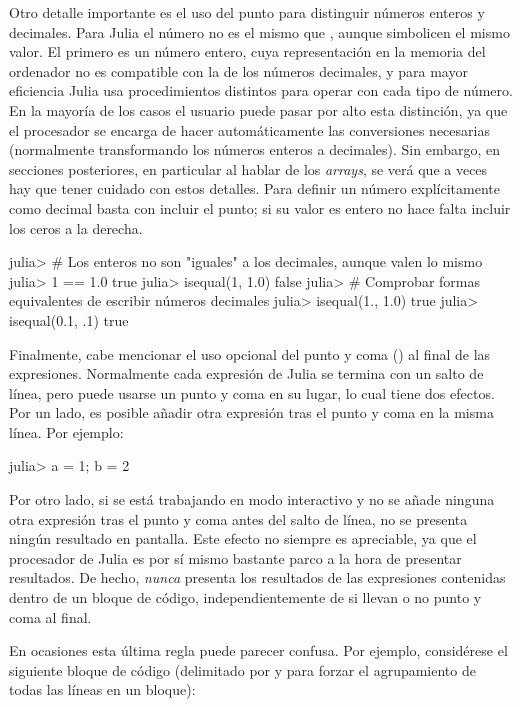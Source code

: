 Otro detalle importante es el uso del punto para distinguir números enteros y decimales. Para Julia el número  no es el mismo que , aunque simbolicen el mismo valor. El primero es un número entero, cuya representación en la memoria del ordenador no es compatible con la de los números decimales, y para mayor eficiencia Julia usa procedimientos distintos para operar con cada tipo de número. En la mayoría de los casos el usuario puede pasar por alto esta distinción, ya que el procesador se encarga de hacer automáticamente las conversiones necesarias (normalmente transformando los números enteros a decimales). Sin embargo, en secciones posteriores, en particular al hablar de los \emph{arrays}, se verá que a veces hay que tener cuidado con estos detalles. Para definir un número explícitamente como decimal basta con incluir el punto; si su valor es entero no hace falta incluir los ceros a la derecha.

\begin{jlconcode}
julia> # Los enteros no son "iguales" a los decimales, aunque valen lo mismo
julia> 1 == 1.0
true
julia> isequal(1, 1.0)
false
julia> # Comprobar formas equivalentes de escribir números decimales
julia> isequal(1., 1.0)
true
julia> isequal(0.1, .1)
true
\end{jlconcode}

Finalmente, cabe mencionar el uso opcional del punto y coma (\code{;}) al final de las expresiones. Normalmente cada expresión de Julia se termina con un salto de línea, pero puede usarse un punto y coma en su lugar, lo cual tiene dos efectos. Por un lado, es posible añadir otra expresión tras el punto y coma en la misma línea. Por ejemplo:

\begin{jlconcode}
julia> a = 1; b = 2
\end{jlconcode}

Por otro lado, si se está trabajando en modo interactivo y no se añade ninguna otra expresión tras el punto y coma antes del salto de línea, no se presenta ningún resultado en pantalla. Este efecto no siempre es apreciable, ya que el procesador de Julia es por sí mismo bastante parco a la hora de presentar resultados. De hecho, \emph{nunca} presenta los resultados de las expresiones contenidas dentro de un bloque de código, independientemente de si llevan o no punto y coma al final.

En ocasiones esta última regla puede parecer confusa. Por ejemplo, considérese el siguiente bloque de código (delimitado por  y  para forzar el agrupamiento de todas las líneas en un bloque):

